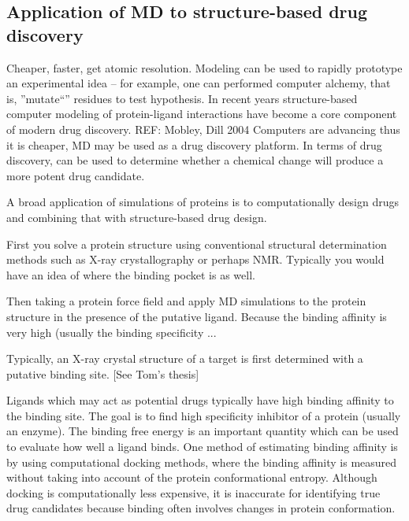 \subsection{Application of MD to structure-based drug discovery}
\begin{outline}


	\1 Cheaper, faster, get atomic resolution. Modeling can be used to rapidly prototype an experimental idea -- for example, one can performed computer alchemy, that is, ''mutate``'' residues to test hypothesis. In recent years structure-based computer modeling of protein-ligand interactions have become a core component of modern drug discovery. REF: Mobley, Dill 2004 Computers are advancing thus it is cheaper, MD may be used as a drug discovery platform. In terms of drug discovery, can be used to determine whether a chemical change will produce a more potent drug candidate.

	\1 A broad application of simulations of proteins is to computationally design drugs and combining that with structure-based drug design.
	
	  \2 First you solve a protein structure using conventional structural determination methods such as X-ray crystallography or perhaps NMR.  Typically you would have an idea of where the binding pocket is as well. 
	
	  \2 Then taking a protein force field and apply MD simulations to the protein structure in the presence of the putative ligand.  Because the binding affinity is very high (usually the binding specificity ...

	\1 Typically, an X-ray crystal structure of a target is first determined with a putative binding site. [See Tom's thesis]
	
	\1 Ligands which may act as potential drugs typically have high binding affinity to the binding site. The goal is to find high specificity inhibitor of a protein (usually an enzyme). The binding free energy is an important quantity which can be used to evaluate how well a ligand binds. One method of estimating binding affinity is by using computational docking methods, where the binding affinity is measured without taking into account of the protein conformational entropy.  Although docking is computationally less expensive, it is inaccurate for identifying true drug candidates because binding often involves changes in protein conformation.


\end{outline}

